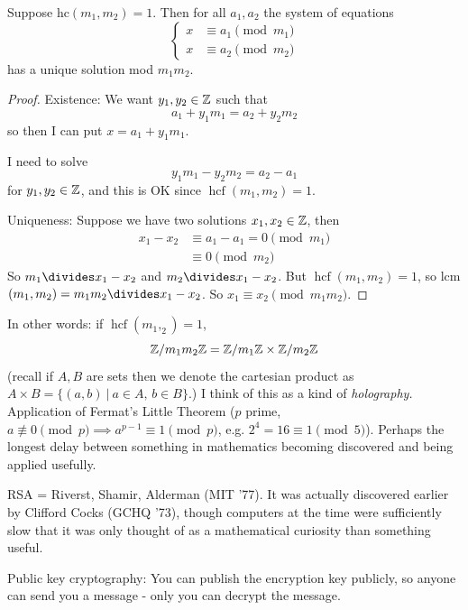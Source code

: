 \documentclass[10pt]{scrartcl}
\DeclareMathOperator{\hcf}{hcf}
\begin{document}
\begin{theorem}
Suppose hc$(m_1,m_2) = 1$. Then for all $a_1,a_2$ the system of equations
\[\begin{cases}
x &\equiv a_1 \pmod{m_1}\\
x &\equiv a_2 \pmod{m_2}	
\end{cases}
\]
has a unique solution mod $m_1 m_2$. 
\end{theorem}

\begin{proof}
Existence: We want $y_1,y_2 \in\mathbb{Z}$ such that
\[a_1 + y_1 m_1 = a_2 + y_2m_2\]
so then I can put $x = a_1+y_1m_1$. 

I need to solve
\[y_1 m_1 - y_2m_2 = a_2 - a_1\]
for $y_1,y_2 \in\mathbb{Z}$, and this is OK since $\hcf(m_1,m_2) = 1$. 

Uniqueness: Suppose we have two solutions $x_1,x_2 \in\mathbb{Z}$, then 
\[
\begin{aligned}
  x_1 - x_2 &\equiv a_1 - a_1 = 0 \pmod{m_1}\\
  &\equiv  0 \pmod{m_2}
\end{aligned}
\]
So $m_1 \divides x_1 - x_2$ and $m_2 \divides x_1 - x_2$. But $\hcf(m_1,m_2) = 1$, so lcm$(m_1,m_2) = m_1m_2 \divides x_1 - x_2$. So $x_1 \equiv x_2 \pmod{m_1m_2}$. 
\end{proof}


In other words: if $\hcf(m_1,_2) = 1$, \[\mathbb{Z} / m_1m_2\mathbb{Z} = \mathbb{Z}/ m_1\mathbb{Z} \times \mathbb{Z} / m_2\mathbb{Z}  \]
(recall if $A,B$ are sets then we denote the cartesian product as $A \times B = \{(a,b) ~|~ a \in A,\, b \in B\}$.) I think of this as a kind of \emph{holography.}\\



Application of 
Fermat's Little Theorem ($p$ prime, $a \not \equiv 0 \pmod{p} \implies a^{p-1} \equiv 1 \pmod{p}$, e.g. $2^4 = 16 \equiv 1 \pmod{5}$). Perhaps the longest delay between something in mathematics becoming discovered and being applied usefully. 

RSA = Riverst, Shamir, Alderman (MIT '77). It was actually discovered earlier by Clifford Cocks (GCHQ '73), though computers at the time were sufficiently slow that it was only thought of as a mathematical curiosity than something useful. 

Public key cryptography: You can publish the encryption key publicly, so anyone can send you a message - only you can decrypt the message. 
\end{document}
